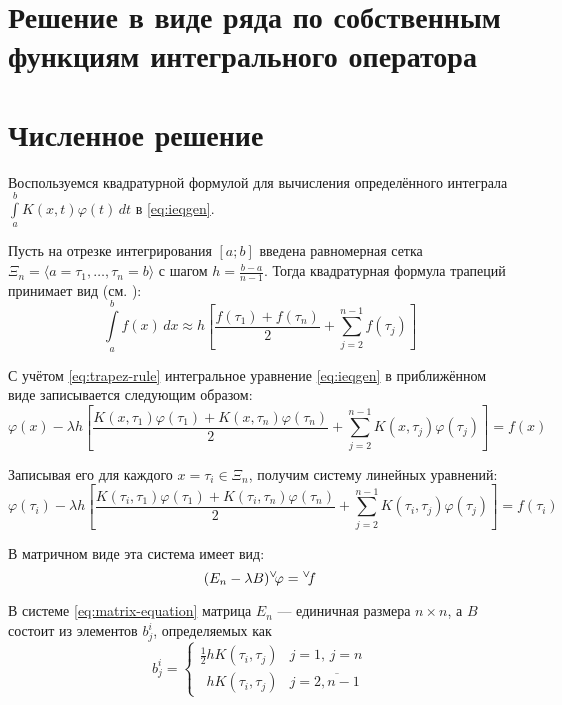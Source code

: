 \documentclass{article}
\numberwithin{equation}{section}
\renewcommand{\phi}{\varphi}
\newcommand{\intl}{\int\limits}
\renewcommand{\vec}[1]{{}^{\vee}\negmedspace#1}
\begin{document}
\section{Решение в виде ряда по собственным функциям интегрального
  оператора}

\section{Численное решение}
\label{sec:numeric}
Воспользуемся квадратурной формулой для вычисления определённого
интеграла $\intl_a^b {K(x, t) \phi(t)\,dt}$ в \eqref{eq:ieqgen}.

Пусть на отрезке интегрирования $[a; b]$ введена равномерная сетка
$\Xi_n = \langle a = \tau_1, \dotsc, \tau_n = b \rangle$ с шагом
$h = \frac{b-a}{n-1}$. Тогда квадратурная формула трапеций принимает
вид (см. \cite{bakhvalov01}):
\begin{equation}
  \label{eq:trapez-rule}
  \intl_a^b{f(x)\,dx} \approx h \left [ \frac{f(\tau_1)+f(\tau_n)}{2} +
  \sum_{j=2}^{n-1} f(\tau_j) \right ]
\end{equation}

С учётом \eqref{eq:trapez-rule} интегральное уравнение
\eqref{eq:ieqgen} в приближённом виде записывается следующим образом:
\begin{equation*}
  \phi(x) - \lambda h \left[ 
    \frac{K(x,\tau_1) \phi(\tau_1) + 
      K(x,\tau_n) \phi(\tau_n)}{2} + 
    \sum_{j=2}^{n-1} K(x, \tau_{j}) \phi(\tau_{j}) 
  \right] = f(x)
\end{equation*}

Записывая его для каждого $x = \tau_i \in \Xi_n$, получим систему линейных
уравнений:
\begin{equation*}
  \phi(\tau_i) - \lambda h \left[ 
    \frac{K(\tau_i,\tau_1) \phi(\tau_1) + 
      K(\tau_i,\tau_n) \phi(\tau_n)}{2} + 
    \sum_{j=2}^{n-1} K(\tau_i, \tau_{j}) \phi(\tau_{j}) 
  \right] = f(\tau_i)
\end{equation*}

В матричном виде эта система имеет вид:
\begin{equation}
  \label{eq:matrix-equation}
  (E_n-\lambda B) \vec{\phi} = \vec{f}
\end{equation}

В системе \eqref{eq:matrix-equation} матрица $E_n$ — единичная размера
$n×n$, а $B$ состоит из элементов $b_j^i$, определяемых как
\begin{equation}
  \label{eq:B-matrix-element}
  b_j^i =
  \begin{cases}
    \frac{1}{2}hK(\tau_i, \tau_j) & j = 1,\, j = n \\
    \phantom{\frac{1}{2}} hK(\tau_i, \tau_j) & j = \overline{2,n-1}
  \end{cases}
\end{equation}
\end{document}
